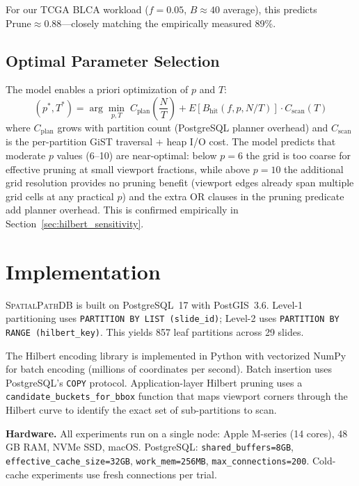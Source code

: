 \documentclass[10pt,twocolumn]{article}
\begin{document}
For our TCGA BLCA workload ($f=0.05$, $B \approx 40$ average), this predicts $\text{Prune} \approx 0.88$---closely matching the empirically measured 89\%.

\subsection{Optimal Parameter Selection}

The model enables a priori optimization of $p$ and $T$:
\begin{equation}
(p^*, T^*) = \arg\min_{p, T} \; C_{\text{plan}}\!\left(\frac{N}{T}\right) + E[B_{\text{hit}}(f, p, N/T)] \cdot C_{\text{scan}}\!\left(T\right)
\end{equation}
where $C_{\text{plan}}$ grows with partition count (PostgreSQL planner overhead) and $C_{\text{scan}}$ is the per-partition GiST traversal + heap I/O cost.
The model predicts that moderate $p$ values (6--10) are near-optimal: below $p{=}6$ the grid is too coarse for effective pruning at small viewport fractions, while above $p{=}10$ the additional grid resolution provides no pruning benefit (viewport edges already span multiple grid cells at any practical $p$) and the extra OR clauses in the pruning predicate add planner overhead.
This is confirmed empirically in Section~\ref{sec:hilbert_sensitivity}.

\section{Implementation}
\label{sec:implementation}

\textsc{SpatialPathDB} is built on PostgreSQL~17 with PostGIS~3.6.
Level-1 partitioning uses \texttt{PARTITION BY LIST (slide\_id)}; Level-2 uses \texttt{PARTITION BY RANGE (hilbert\_key)}.
This yields 857 leaf partitions across 29 slides.

The Hilbert encoding library is implemented in Python with vectorized NumPy for batch encoding (millions of coordinates per second).
Batch insertion uses PostgreSQL's \texttt{COPY} protocol.
Application-layer Hilbert pruning uses a \texttt{candidate\_buckets\_for\_bbox} function that maps viewport corners through the Hilbert curve to identify the exact set of sub-partitions to scan.

\textbf{Hardware.} All experiments run on a single node: Apple M-series (14 cores), 48\,GB RAM, NVMe SSD, macOS.
PostgreSQL: \texttt{shared\_buffers=8GB}, \texttt{effective\_cache\_size=32GB}, \texttt{work\_mem=256MB}, \texttt{max\_connections=200}.
Cold-cache experiments use fresh connections per trial.
\end{document}
